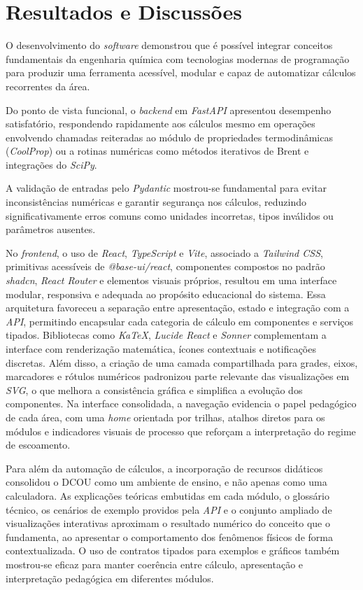 \chapter{Resultados e Discussões}

O desenvolvimento do \textit{software} demonstrou que é possível integrar conceitos fundamentais da engenharia química com tecnologias modernas de programação para produzir uma ferramenta acessível, modular e capaz de automatizar cálculos recorrentes da área.

Do ponto de vista funcional, o \textit{backend} em \textit{FastAPI} apresentou desempenho satisfatório, respondendo rapidamente aos cálculos mesmo em operações envolvendo chamadas reiteradas ao módulo de propriedades termodinâmicas (\textit{CoolProp}) ou a rotinas numéricas como métodos iterativos de Brent e integrações do \textit{SciPy}.

A validação de entradas pelo \textit{Pydantic} mostrou-se fundamental para evitar inconsistências numéricas e garantir segurança nos cálculos, reduzindo significativamente erros comuns como unidades incorretas, tipos inválidos ou parâmetros ausentes.

No \textit{frontend}, o uso de \textit{React}, \textit{TypeScript} e \textit{Vite}, associado a \textit{Tailwind CSS}, primitivas acessíveis de \textit{@base-ui/react}, componentes compostos no padrão \textit{shadcn}, \textit{React Router} e elementos visuais próprios, resultou em uma interface modular, responsiva e adequada ao propósito educacional do sistema. Essa arquitetura favoreceu a separação entre apresentação, estado e integração com a \textit{API}, permitindo encapsular cada categoria de cálculo em componentes e serviços tipados. Bibliotecas como \textit{KaTeX}, \textit{Lucide React} e \textit{Sonner} complementam a interface com renderização matemática, ícones contextuais e notificações discretas. Além disso, a criação de uma camada compartilhada para grades, eixos, marcadores e rótulos numéricos padronizou parte relevante das visualizações em \textit{SVG}, o que melhora a consistência gráfica e simplifica a evolução dos componentes. Na interface consolidada, a navegação evidencia o papel pedagógico de cada área, com uma \textit{home} orientada por trilhas, atalhos diretos para os módulos e indicadores visuais de processo que reforçam a interpretação do regime de escoamento.

Para além da automação de cálculos, a incorporação de recursos didáticos consolidou o DCOU como um ambiente de ensino, e não apenas como uma calculadora. As explicações teóricas embutidas em cada módulo, o glossário técnico, os cenários de exemplo providos pela \textit{API} e o conjunto ampliado de visualizações interativas aproximam o resultado numérico do conceito que o fundamenta, ao apresentar o comportamento dos fenômenos físicos de forma contextualizada. O uso de contratos tipados para exemplos e gráficos também mostrou-se eficaz para manter coerência entre cálculo, apresentação e interpretação pedagógica em diferentes módulos.

